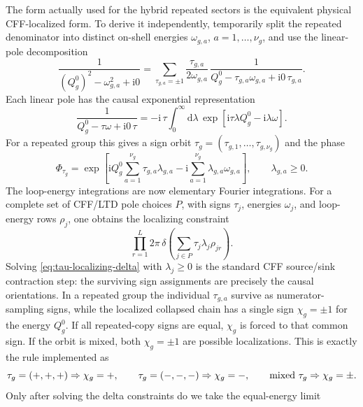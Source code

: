 \documentclass[11pt,a4paper]{report}
\newcommand{\dd}{\mathrm{d}}
\newcommand{\ii}{\mathrm{i}}
\begin{document}
The form actually used for the hybrid repeated sectors is the equivalent
physical CFF-localized form.  To derive it independently, temporarily split the
repeated denominator into distinct on-shell energies
\(\omega_{g,a}\), \(a=1,\ldots,\nu_g\), and use the linear-pole
decomposition
\begin{equation}
  \frac{1}{(Q_g^0)^2-\omega_{g,a}^2+\ii0}
  =
  \sum_{\tau_{g,a}=\pm1}
  \frac{\tau_{g,a}}{2\omega_{g,a}}\,
  \frac{1}{Q_g^0-\tau_{g,a}\omega_{g,a}+\ii0\,\tau_{g,a}}.
  \label{eq:linear-pole-decomposition}
\end{equation}
Each linear pole has the causal exponential representation
\begin{equation}
  \frac{1}{Q_g^0-\tau\omega+\ii0\,\tau}
  =
  -\ii\,\tau\int_0^\infty \dd \lambda\,
  \exp\!\left[
    \ii\tau\lambda Q_g^0-\ii\lambda\omega
  \right] .
  \label{eq:linear-pole-exponential}
\end{equation}
For a repeated group this gives a sign orbit
\(\tau_g=(\tau_{g,1},\ldots,\tau_{g,\nu_g})\) and the phase
\begin{equation}
  \Phi_{\tau_g}
  =
  \exp\!\left[
    \ii Q_g^0\sum_{a=1}^{\nu_g}\tau_{g,a}\lambda_{g,a}
    -\ii\sum_{a=1}^{\nu_g}\lambda_{g,a}\omega_{g,a}
  \right],
  \qquad \lambda_{g,a}\ge0 .
  \label{eq:repeated-cff-phase}
\end{equation}
The loop-energy integrations are now elementary Fourier integrations.  For a
complete set of CFF/LTD pole choices \(P\), with signs \(\tau_j\), energies
\(\omega_j\), and loop-energy rows \(\rho_j\), one obtains the localizing
constraint
\begin{equation}
  \prod_{r=1}^{L}
  2\pi\,
  \delta\!\left(
    \sum_{j\in P}\tau_j\lambda_j\rho_{jr}
  \right).
  \label{eq:tau-localizing-delta}
\end{equation}
Solving \eqref{eq:tau-localizing-delta} with \(\lambda_j\ge0\) is the
standard CFF source/sink contraction step: the surviving sign assignments are
precisely the causal orientations.  In a repeated group the individual
\(\tau_{g,a}\) survive as numerator-sampling signs, while the localized
collapsed chain has a single sign \(\chi_g=\pm1\) for the energy \(Q_g^0\).
If all repeated-copy signs are equal, \(\chi_g\) is forced to that common sign.
If the orbit is mixed, both \(\chi_g=\pm1\) are possible localizations.  This
is exactly the rule implemented as
\[
  \tau_g=(+,+,+)\Rightarrow \chi_g=+,\qquad
  \tau_g=(-,-,-)\Rightarrow \chi_g=-,\qquad
  \hbox{mixed }\tau_g\Rightarrow \chi_g=\pm .
\]
Only after solving the delta constraints do we take the equal-energy limit
\end{document}

